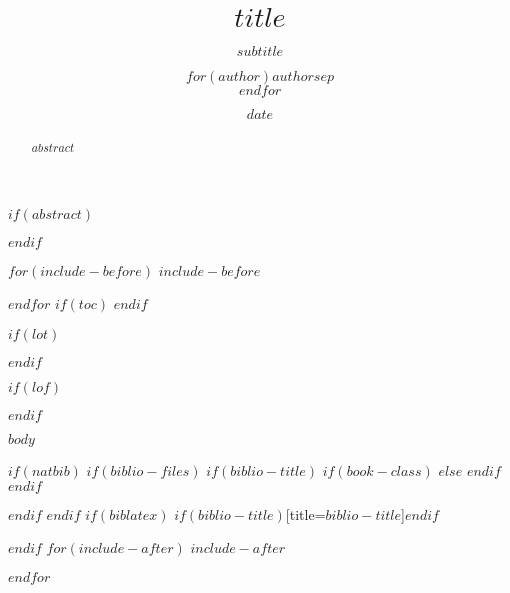 \documentclass[
  a5paper,
  pagesize,
  9pt,
  pointlessnumbers,
  normalheadings,
  twoside=false
]{book}
\title{$title$}
\title{}
\subtitle{$subtitle$}
\author{$for(author)$$author$$sep$ \\ $endfor$}
\author{}
\date{$date$}
\date{}
\begin{document}
\maketitle

$if(abstract)$
\begin{abstract}
$abstract$
\end{abstract}
$endif$

$for(include-before)$
$include-before$

$endfor$
$if(toc)$
{
\hypersetup{linkcolor=black}
\setcounter{tocdepth}{$toc-depth$}
\tableofcontents
}
$endif$

$if(lot)$
\listoftables
$endif$

$if(lof)$
\listoffigures
$endif$

$body$ %

$if(natbib)$
$if(biblio-files)$
$if(biblio-title)$
$if(book-class)$
\renewcommand\bibname{$biblio-title$}
$else$
\renewcommand\refname{$biblio-title$}
$endif$
$endif$


$endif$
$endif$
$if(biblatex)$
\printbibliography$if(biblio-title)$[title=$biblio-title$]$endif$

$endif$
$for(include-after)$
$include-after$

$endfor$
\end{document}
